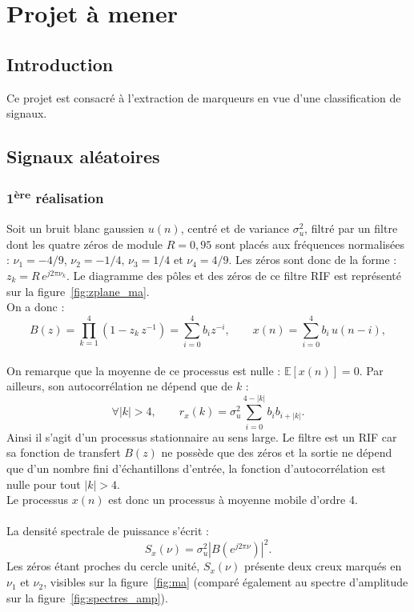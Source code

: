 \documentclass[11pt,a4paper]{article}
\begin{document}
\section{Projet à mener}

\subsection{Introduction}
Ce projet est consacré à l'extraction de marqueurs en vue d'une classification de signaux.

\subsection{Signaux aléatoires}
\subsubsection{1\textsuperscript{ère} réalisation}
Soit un bruit blanc gaussien $u(n)$, centré et de variance $\sigma_u^2$, filtré par un filtre dont les quatre zéros de module $R = 0{,}95$ sont placés aux fréquences normalisées : $\nu_1 = -4/9$, $\nu_2 = -1/4$, $\nu_3 = 1/4$ et $\nu_4 = 4/9$. Les zéros sont donc de la forme : $z_k = R\, e^{j2\pi\nu_k}$. Le diagramme des pôles et des zéros de ce filtre RIF est représenté sur la figure~\ref{fig:zplane_ma}. \\
On a donc : \\
\begin{equation}
  B(z) = \prod_{k=1}^{4} \left( 1 - z_k\, z^{-1} \right)
       = \sum_{i=0}^{4} b_i z^{-i},
  \qquad
  x(n) = \sum_{i=0}^{4} b_i\, u(n-i),
  \label{eq:ma4}
\end{equation} \\
On remarque que la moyenne de ce processus est nulle : $\mathbb{E}[x(n)] = 0$. Par ailleurs, son autocorrélation ne dépend que de $k$ :
\begin{equation}
    \forall |k| > 4,
    \qquad
    r_x(k) = \sigma_u^2 \sum_{i=0}^{4-|k|} b_i b_{i+|k|}.
    \label{eq:r_x}
\end{equation}
Ainsi il s'agit d'un processus stationnaire au sens large. Le filtre est un RIF car sa fonction de transfert
$B(z)$ ne possède que des zéros et la sortie ne dépend que d'un nombre fini
d'échantillons d'entrée, la fonction d'autocorrélation
est nulle pour tout $|k| > 4$.\\
Le processus $x(n)$ est donc un processus à moyenne mobile d'ordre 4. \\ \\
La densité spectrale de puissance s'écrit : \\
\begin{equation}
  S_x(\nu) = \sigma_u^2 \left| B\!\left(e^{j2\pi\nu}\right) \right|^2.
  \label{eq:dsp_ma}
\end{equation}
Les zéros étant proches du cercle unité, $S_x(\nu)$ présente deux creux marqués en
$\nu_1$ et $\nu_2$, visibles sur la figure~\ref{fig:ma} (comparé également au spectre d'amplitude sur la figure~\ref{fig:spectres_amp}).
\end{document}
